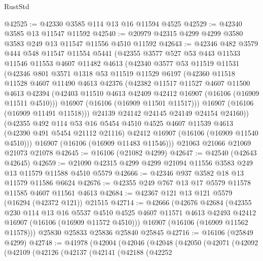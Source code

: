 \begin{lexlean}{RustStd}
\begin{coremodule}
@42525 := @42330 @3585 @114 @13 @16 @11594 @4525
@42529 := @42340 @3585 @13 @11547 @11592
@42540 := @20979 @42315 @4299 @4299 @3580 @3583 @249 @13 @11547 @11556 @4510 @11592
@42643 := @42346
    @482
    @3579
    @444
    @548
    @11547
    @11554
    @5441
    (@42355
      @3577
      @527
      @53
      @443
      @11533
      @11546
      @11553
      @4607
      @11482
      @4613
      (@42340
        @3577
        @53
        @11519
        @11531
        (@42346
          @801
          @3571
          @1318
          @53
          @11519
          @11529
          @6197
          (@42360
            @11518
            @11528
            @4607
            @11490
            @4613
            @42376
            (@42382
              @11517
              @11527
              @4607
              @11500
              @4613
              @42394
              (@42403 @11510 @4613 @42409 @42412 @16907 (@16106 (@16909 @11511 @4510)))
              @16907
              (@16106 (@16909 @11501 @11517)))
            @16907
            (@16106 (@16909 @11491 @11518)))
          @24139
          @24142
          @24145
          @24149
          @24154
          @24160))
      (@42355
        @492
        @114
        @53
        @16
        @5454
        @4510
        @4525
        @4607
        @11539
        @4613
        (@42390 @491 @5454 @21112 @21116)
        @42412
        @16907
        (@16106 (@16909 @11540 @4510)))
      @16907
      (@16106 (@16909 @11483 @11546)))
    @21063
    @21066
    @21069
    @21073
    @21078
@42645 := @16106 (@21082 @4299)
@42647 := @42540 (@42643 @42645)
@42659 := @21090 @42315 @4299 @4299 @21094 @11556 @3583 @249 @13 @11579 @11588 @4510 @5579
@42666 := @42346 @937 @3582 @18 @13 @11579 @11586 @6624
@42676 := @42355 @249 @767 @13 @17 @5579 @11578 @11585 @4607 @11561 @4613
@42684 := @42367 @121 @13 @121 @5579 (@16294 (@42372 @121)) @21515
@42714 := @42666
    (@42676
      @42684
      (@42355
        @230
        @114
        @13
        @16
        @5537
        @4510
        @4525
        @4607
        @11571
        @4613
        @42493
        @42412
        @16907
        (@16106 (@16909 @11572 @4510)))
      @16907
      (@16106 (@16909 @11562 @11578)))
    @25830
    @25833
    @25836
    @25840
    @25845
@42716 := @16106 (@25849 @4299)
@42748 := @41978
    (@42004
      (@42046
        (@42048
          (@42050
            (@42071
              (@42092
                (@42109
                  (@42126
                    (@42137
                      (@42141
                        (@42188
                          (@42252

\end{coremodule}
\end{lexlean}
